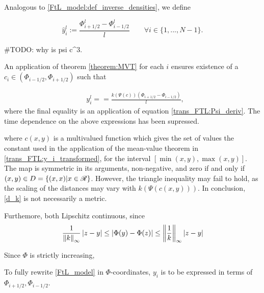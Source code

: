 Analogous to \eqref{FtL_model:def_inverse_densities}, we define 

\begin{equation}
	\hat{y}_i^l := \frac{\Phi^l_{i+1/2} - \Phi^l_{i-1/2}}{l} \quad \quad \forall i \in \{1,...,N-1\} \label{trans_FTL:trans_inverse_densities}. 
\end{equation}

\iffalse

#TODO: why is psi c^3. 


An application of theorem \eqref{theorem:MVT} for each $i$ ensures existence of a $c_i \in (\Phi_{i-1/2}, \Phi_{i+1/2})$ such that 

\begin{align}
	&y^l_i =  = \frac{k\left(\Psi(c)\right) \left(\Phi_{i+1/2} -\Phi_{i-1/2}\right)}{l}, %
\end{align}
where the final equality is an application of equation \eqref{trans_FTL:Psi_deriv}. The time dependence on the above expressions has been supressed.  


where $c(x,y)$ is a multivalued function which gives the set of values the constant used in the application of the mean-value theorem in \eqref{trans_FTL:y_i_transformed}, for the interval $[\min(x,y), \max(x,y)]$.  The map is symmetric in its arguments, non-negative, and zero if and only if $(x,y) \in D=\{{(x,x)|x\in \mathscr{R}}\}$. However, the triangle inequality may fail to hold, as the scaling of the distances may vary with $k\left(\Psi(c(x,y))\right)$. In conclusion, \eqref{d_k} is not necessarily a metric. %





Furthemore, both Lipschitz continuous, since
\begin{align}
	\frac{1}{\left\lVert k\right\rVert_\infty} \left| z - y\right| \leq \left| \Phi(y) - \Phi(z) \right|  \leq  \left\lVert\frac{1}{k}\right\rVert_\infty \left| z - y\right| \label{phi_lipschitz}
\end{align}


Since $\Phi$ is strictly increasing, 

To fully rewrite \eqref{FtL_model} in $\Phi$-coordinates, $y_i$ is to be expressed in terms of $\Phi_{i+1/2}, \Phi_{i-1/2}$. 


